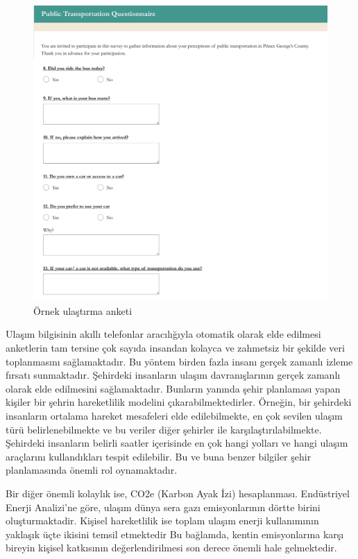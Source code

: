 \begin{figure}[!h]
\centering
\includegraphics[scale=0.4]{projectChapters/images/Transportation_Survey.png}
\caption{Örnek ulaştırma anketi}
\end{figure}

Ulaşım bilgisinin akıllı telefonlar aracılığıyla otomatik olarak elde edilmesi anketlerin tam tersine çok sayıda insandan kolayca ve zahmetsiz bir şekilde veri toplanmasını sağlamaktadır. Bu yöntem birden fazla insanı gerçek zamanlı izleme fırsatı sunmaktadır. Şehirdeki insanların ulaşım davranışlarının gerçek zamanlı olarak elde edilmesini sağlamaktadır. Bunların yanında şehir planlaması yapan kişiler  bir şehrin hareketlilik modelini çıkarabilmektedirler. Örneğin, bir şehirdeki insanların ortalama hareket mesafeleri elde edilebilmekte, en çok sevilen ulaşım türü belirlenebilmekte ve bu veriler diğer şehirler ile karşılaştırılabilmekte. Şehirdeki insanların belirli saatler içerisinde en çok hangi yolları ve hangi ulaşım araçlarını kullandıkları tespit edilebilir. Bu ve buna benzer bilgiler şehir planlamasında önemli rol oynamaktadır.

Bir diğer önemli kolaylık ise, CO2e (Karbon Ayak İzi) hesaplanması. Endüstriyel Enerji Analizi'ne göre, ulaşım dünya sera gazı emisyonlarının dörtte birini oluşturmaktadir. Kişisel hareketlilik ise toplam ulaşım enerji kullanımının yaklaşık üçte ikisini temsil etmektedir Bu bağlamda, kentin emisyonlarına karşı bireyin kişisel katkısının değerlendirilmesi son derece önemli hale gelmektedir.

